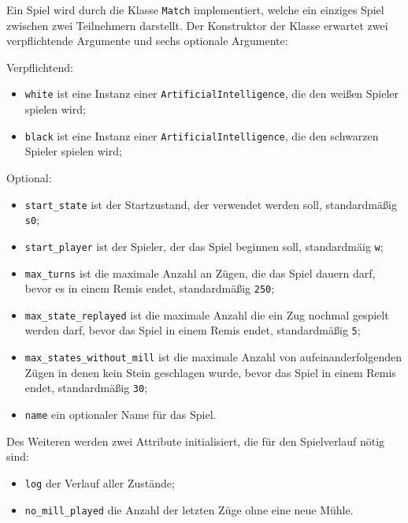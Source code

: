 \documentclass[11pt]{article}
\begin{document}
Ein Spiel wird durch die Klasse \texttt{Match} implementiert, welche ein
einziges Spiel zwischen zwei Teilnehmern darstellt. Der Konstruktor der
Klasse erwartet zwei verpflichtende Argumente und sechs optionale
Argumente:

Verpflichtend:
\begin{itemize}
    \item \texttt{white} ist eine Instanz einer \texttt{ArtificialIntelligence}, die den weißen Spieler spielen wird;
    \item \texttt{black} ist eine Instanz einer \texttt{ArtificialIntelligence}, die den schwarzen Spieler spielen wird;
\end{itemize}

Optional:
\begin{itemize}
    \item \texttt{start\_state} ist der Startzustand, der verwendet werden soll, standardmäßig \texttt{s0};
    \item \texttt{start\_player} ist der Spieler, der das Spiel beginnen soll, standardmäig \texttt{w};
    \item \texttt{max\_turns} ist die maximale Anzahl an Zügen, die das Spiel dauern darf, bevor es in einem Remis endet, standardmäßig \texttt{250};
    \item \texttt{max\_state\_replayed} ist die maximale Anzahl die ein Zug nochmal gespielt werden darf, bevor das Spiel in einem Remis endet, standardmäßig \texttt{5};
    \item \texttt{max\_states\_without\_mill} ist die maximale Anzahl von aufeinanderfolgenden Zügen in denen kein Stein geschlagen wurde, bevor das Spiel in einem Remis endet, standardmäßig \texttt{30};
    \item \texttt{name} ein optionaler Name für das Spiel.
\end{itemize}

Des Weiteren werden zwei Attribute initialisiert, die für den
Spielverlauf nötig sind:
\begin{itemize}
    \item \texttt{log} der Verlauf aller Zustände;
    \item \texttt{no\_mill\_played} die Anzahl der letzten Züge ohne eine neue Mühle.
\end{itemize}
\end{document}
